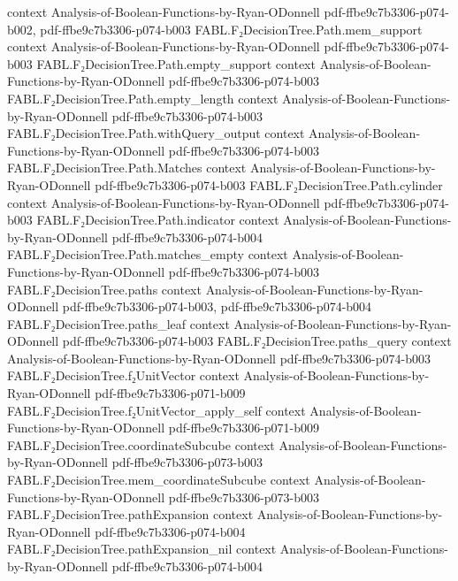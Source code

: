 \begin{theorem}
  {context}
  {Analysis-of-Boolean-Functions-by-Ryan-ODonnell}
  {pdf-ffbe9c7b3306-p074-b002,
    pdf-ffbe9c7b3306-p074-b003}
\proofstep
  {FABL.F₂DecisionTree.Path.mem_support}
  {context}
  {Analysis-of-Boolean-Functions-by-Ryan-ODonnell}
  {pdf-ffbe9c7b3306-p074-b003}
\proofstep
  {FABL.F₂DecisionTree.Path.empty_support}
  {context}
  {Analysis-of-Boolean-Functions-by-Ryan-ODonnell}
  {pdf-ffbe9c7b3306-p074-b003}
\proofstep
  {FABL.F₂DecisionTree.Path.empty_length}
  {context}
  {Analysis-of-Boolean-Functions-by-Ryan-ODonnell}
  {pdf-ffbe9c7b3306-p074-b003}
\proofstep
  {FABL.F₂DecisionTree.Path.withQuery_output}
  {context}
  {Analysis-of-Boolean-Functions-by-Ryan-ODonnell}
  {pdf-ffbe9c7b3306-p074-b003}
\proofstep
  {FABL.F₂DecisionTree.Path.Matches}
  {context}
  {Analysis-of-Boolean-Functions-by-Ryan-ODonnell}
  {pdf-ffbe9c7b3306-p074-b003}
\proofstep
  {FABL.F₂DecisionTree.Path.cylinder}
  {context}
  {Analysis-of-Boolean-Functions-by-Ryan-ODonnell}
  {pdf-ffbe9c7b3306-p074-b003}
\proofstep
  {FABL.F₂DecisionTree.Path.indicator}
  {context}
  {Analysis-of-Boolean-Functions-by-Ryan-ODonnell}
  {pdf-ffbe9c7b3306-p074-b004}
\proofstep
  {FABL.F₂DecisionTree.Path.matches_empty}
  {context}
  {Analysis-of-Boolean-Functions-by-Ryan-ODonnell}
  {pdf-ffbe9c7b3306-p074-b003}
\proofstep
  {FABL.F₂DecisionTree.paths}
  {context}
  {Analysis-of-Boolean-Functions-by-Ryan-ODonnell}
  {pdf-ffbe9c7b3306-p074-b003,
    pdf-ffbe9c7b3306-p074-b004}
\proofstep
  {FABL.F₂DecisionTree.paths_leaf}
  {context}
  {Analysis-of-Boolean-Functions-by-Ryan-ODonnell}
  {pdf-ffbe9c7b3306-p074-b003}
\proofstep
  {FABL.F₂DecisionTree.paths_query}
  {context}
  {Analysis-of-Boolean-Functions-by-Ryan-ODonnell}
  {pdf-ffbe9c7b3306-p074-b003}
\proofstep
  {FABL.F₂DecisionTree.f₂UnitVector}
  {context}
  {Analysis-of-Boolean-Functions-by-Ryan-ODonnell}
  {pdf-ffbe9c7b3306-p071-b009}
\proofstep
  {FABL.F₂DecisionTree.f₂UnitVector_apply_self}
  {context}
  {Analysis-of-Boolean-Functions-by-Ryan-ODonnell}
  {pdf-ffbe9c7b3306-p071-b009}
\proofstep
  {FABL.F₂DecisionTree.coordinateSubcube}
  {context}
  {Analysis-of-Boolean-Functions-by-Ryan-ODonnell}
  {pdf-ffbe9c7b3306-p073-b003}
\proofstep
  {FABL.F₂DecisionTree.mem_coordinateSubcube}
  {context}
  {Analysis-of-Boolean-Functions-by-Ryan-ODonnell}
  {pdf-ffbe9c7b3306-p073-b003}
\proofstep
  {FABL.F₂DecisionTree.pathExpansion}
  {context}
  {Analysis-of-Boolean-Functions-by-Ryan-ODonnell}
  {pdf-ffbe9c7b3306-p074-b004}
\proofstep
  {FABL.F₂DecisionTree.pathExpansion_nil}
  {context}
  {Analysis-of-Boolean-Functions-by-Ryan-ODonnell}
  {pdf-ffbe9c7b3306-p074-b004}

\end{theorem}
